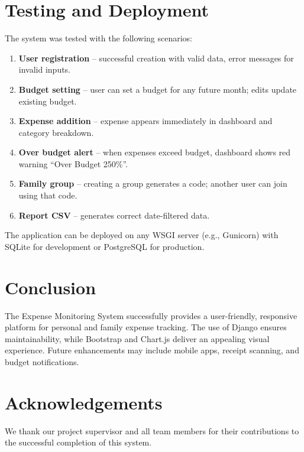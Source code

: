 \documentclass[12pt,a4paper]{article}
\begin{document}
\section{Testing and Deployment}
The system was tested with the following scenarios:

\begin{enumerate}
    \item \textbf{User registration} – successful creation with valid data, error messages for invalid inputs.
    \item \textbf{Budget setting} – user can set a budget for any future month; edits update existing budget.
    \item \textbf{Expense addition} – expense appears immediately in dashboard and category breakdown.
    \item \textbf{Over budget alert} – when expenses exceed budget, dashboard shows red warning “Over Budget 250\%”.
    \item \textbf{Family group} – creating a group generates a code; another user can join using that code.
    \item \textbf{Report CSV} – generates correct date-filtered data.
\end{enumerate}

The application can be deployed on any WSGI server (e.g., Gunicorn) with SQLite for development or PostgreSQL for production.

\section{Conclusion}
The Expense Monitoring System successfully provides a user-friendly, responsive platform for personal and family expense tracking. The use of Django ensures maintainability, while Bootstrap and Chart.js deliver an appealing visual experience. Future enhancements may include mobile apps, receipt scanning, and budget notifications.

\section*{Acknowledgements}
We thank our project supervisor and all team members for their contributions to the successful completion of this system.
\end{document}

